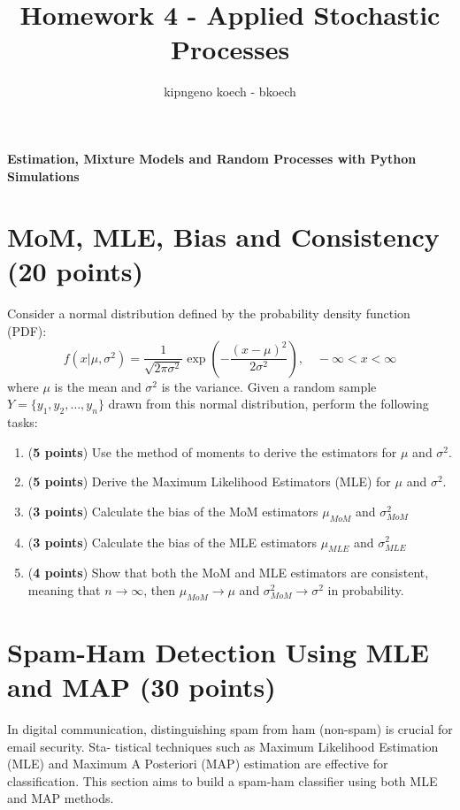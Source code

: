 \documentclass[a3paper,12pt]{extarticle} %
\begin{document}
\author{kipngeno koech - bkoech}
\title{Homework 4 - Applied Stochastic Processes}   
\maketitle

\medskip

\maketitle
\begin{center}
    \large \textbf{Estimation, Mixture Models and Random Processes with Python Simulations}
\end{center}

\section{ MoM, MLE, Bias and Consistency (20 points)}
Consider a normal distribution defined by the probability density function (PDF):
\begin{equation}
    f(x|\mu, \sigma^2) = \frac{1}{\sqrt{2\pi\sigma^2}}\exp\left(-\frac{(x-\mu)^2}{2\sigma^2}\right), \quad -\infty < x < \infty
\end{equation}
where $\mu$ is the mean and $\sigma^2$ is the variance. Given a random sample $Y         = \{y_1, y_2, \ldots, y_n\}$ drawn from
this normal distribution, perform the following tasks:
\begin{enumerate}
    \item (\textbf{5 points}) Use the method of moments to derive the estimators for \(\mu\) and \(\sigma^2\).
    \item (\textbf{5 points}) Derive the Maximum Likelihood Estimators (MLE) for \(\mu\) and \(\sigma^2\).
    \item (\textbf{3 points})  Calculate the bias of the MoM estimators \(\mu_{MoM}\) and \(\sigma^2_{MoM}\)
    \item (\textbf{3 points})  Calculate the bias of the MLE estimators \(\mu_{MLE}\) and \(\sigma^2_{MLE}\)
    \item (\textbf{4 points})  Show that both the MoM and MLE estimators are consistent, meaning that  \(n \rightarrow \infty\), then \(\mu_{MoM} \rightarrow \mu\) and \(\sigma^2_{MoM} \rightarrow \sigma^2\) in probability.
\end{enumerate}
\newpage
\section{Spam-Ham Detection Using MLE and MAP (30 points)}
In digital communication, distinguishing spam from ham (non-spam) is crucial for email security. Sta-
tistical techniques such as Maximum Likelihood Estimation (MLE) and Maximum A Posteriori (MAP)
estimation are effective for classification. This section aims to build a spam-ham classifier using both
MLE and MAP methods.
\end{document}
